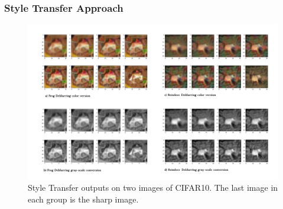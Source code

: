 \documentclass [handout] {beamer}
\begin{document}
\begin{frame}
	\frametitle{Style Transfer Approach}
	\begin{figure}[hptb]
	\centering
	\includegraphics[scale=0.07]{../style_outputs.png} 
	\caption{Style Transfer outputs on two images of CIFAR10. The last image in each group is the 	sharp image.}
	\label{style_outputs}
	\end{figure}
\end{frame}
\end{document}
